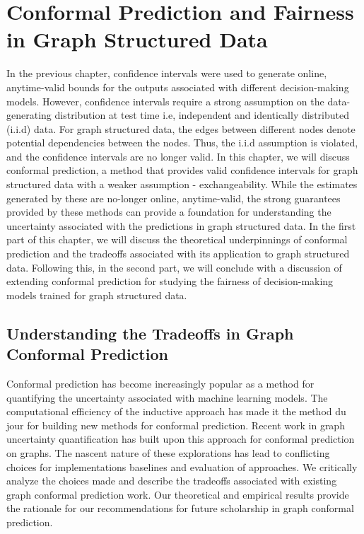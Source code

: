 \chapter{Conformal Prediction and Fairness in Graph Structured Data}
In the previous chapter, confidence intervals were used to generate online, anytime-valid bounds for the outputs associated with different decision-making models.
However, confidence intervals require a strong assumption on the data-generating distribution at test time i.e, independent and identically distributed (i.i.d) data.
For graph structured data, the edges between different nodes denote potential dependencies between the nodes.
Thus, the i.i.d assumption is violated, and the confidence intervals are no longer valid.
In this chapter, we will discuss conformal prediction, a method that provides valid confidence intervals for graph structured data with a weaker assumption - exchangeability.
While the estimates generated by these are no-longer online, anytime-valid, the strong guarantees provided by these methods can provide a foundation for understanding the uncertainty associated with the predictions in graph structured data.
In the first part of this chapter, we will discuss the theoretical underpinnings of conformal prediction and the tradeoffs associated with its application to graph structured data.
Following this, in the second part, we will conclude with a discussion of extending conformal prediction for studying the fairness of decision-making models trained for graph structured data.

\section{Understanding the Tradeoffs in Graph Conformal Prediction}

Conformal prediction has become increasingly popular as a method for quantifying the uncertainty associated with machine learning models. 
The computational efficiency of the inductive approach has made it the method du jour for building new methods for conformal prediction.
Recent work in graph uncertainty quantification has built upon this approach for conformal prediction on graphs.
The nascent nature of these explorations has lead to conflicting choices for implementations baselines and evaluation of approaches.
We critically analyze the choices made and describe the tradeoffs associated with existing graph conformal prediction work. 
Our theoretical and empirical results provide the rationale for our recommendations for future scholarship in graph conformal prediction.

